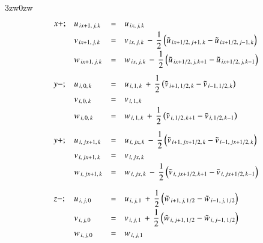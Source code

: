 \begin{indentation}{3zw}{0zw}
\begin{equation}
\begin{array}{llll}
\vspace{1mm}
x+; & u_{\,ix+1,\,j,\,k} &=& u_{\,ix,\,j,\,k} \\
\vspace{1mm}
& v_{\,ix+1,\,j,\,k} &=& \displaystyle{ v_{\,ix,\,j,\,k} \,-\, \frac{1}{2}\left( \tilde{u}_{\,ix+1/2,\,j+1,\,k}-\tilde{u}_{\,ix+1/2,\,j-1,\,k}\right)}\\
\vspace{3mm}
& w_{\,ix+1,\,j,\,k} &=& \displaystyle{ w_{\,ix,\,j,\,k} \,-\, \frac{1}{2}\left( \tilde{u}_{\,ix+1/2,\,j,\,k+1}-\tilde{u}_{\,ix+1/2,\,j,\,k-1}\right)}\\

\vspace{1mm}
y-; & u_{\,i,\,0,\,k} &=& \displaystyle{ u_{\,i,\,1,\,k} \,+\, \frac{1}{2}\left( \tilde{v}_{\,i+1,\,1/2,\,k}-\tilde{v}_{\,i-1,\,1/2,\,k}\right)}\\
\vspace{1mm}
& v_{\,i,\,0,\,k} &=& v_{\,i,\,1,\,k}\\
\vspace{3mm}
& w_{\,i,\,0,\,k} &=& \displaystyle{ w_{\,i,\,1,\,k} \,+\, \frac{1}{2}\left( \tilde{v}_{\,i,\,1/2,\,k+1}-\tilde{v}_{\,i,\,1/2,\,k-1}\right)}\\

\vspace{1mm}
y+; & u_{\,i,\,jx+1,\,k} &=& \displaystyle{ u_{\,i,\,jx,\,k} \,-\, \frac{1}{2}\left( \tilde{v}_{\,i+1,\,jx+1/2,\,k}-\tilde{v}_{\,i-1,\,jx+1/2,\,k}\right)}\\
\vspace{1mm}
& v_{\,i,\,jx+1,\,k} &=& v_{\,i,\,jx,\,k}\\
\vspace{4mm}
& w_{\,i,\,jx+1,\,k} &=& \displaystyle{ w_{\,i,\,jx,\,k} \,-\, \frac{1}{2}\left( \tilde{v}_{\,i,\,jx+1/2,\,k+1}-\tilde{v}_{\,i,\,jx+1/2,\,k-1}\right)}\\

\vspace{1mm}
z-; & u_{\,i,\,j,\,0} &=& \displaystyle{ u_{\,i,\,j,\,1} \,+\, \frac{1}{2}\left( \tilde{w}_{\,i+1,\,j,\,1/2}-\tilde{w}_{\,i-1,\,j,\,1/2}\right)}\\
\vspace{1mm}
& v_{\,i,\,j,\,0} &=& \displaystyle{ v_{\,i,\,j,\,1} \,+\, \frac{1}{2}\left( \tilde{w}_{\,i,\,j+1,\,1/2}-\tilde{w}_{\,i,\,j-1,\,1/2}\right)}\\
\vspace{3mm}
& w_{\,i,\,j,\,0} &=& w_{\,i,\,j,\,1}\\


\end{array}
\end{equation}
\end{indentation}
